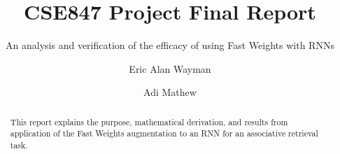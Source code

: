 \documentclass[siggraph, review=false]{acmart}
\begin{document}
\title{CSE847 Project Final Report}
\subtitle{An analysis and verification of the efficacy of using Fast Weights with RNNs}

\author{Eric Alan Wayman}

\author{Adi Mathew}

\begin{abstract}
This report explains the purpose, mathematical derivation, and results from application of the Fast Weights augmentation \cite{DBLP:conf/nips/BaHMLI16} to an RNN for an associative retrieval task.
\end{abstract}


\maketitle

% 





\end{document}
